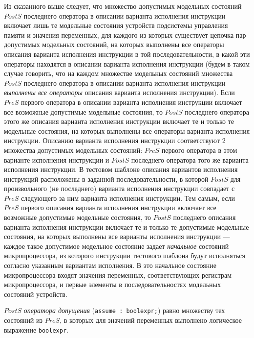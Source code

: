 Из сказанного выше следует, что множество допустимых модельных состояний $PostS$ последнего оператора в описании варианта исполнения инструкции включает лишь те модельные состояния устройств подсистемы управления памяти и значения переменных, для каждого из которых существует цепочка пар допустимых модельных состояний, на которых выполнены все операторы описания варианта исполнения инструкции в той последовательности, в какой эти операторы находятся в описании варианта исполнения инструкции (будем в таком случае говорить, что на каждом множестве модельных состояний множества $PostS$ последнего оператора в описании варианта исполнения инструкции \emph{выполнены все операторы} описания варианта исполнения инструкции). Если $PreS$ первого оператора в описании варианта исполнения инструкции включает все возможные допустимые модельные состояния, то $PostS$ последнего оператора этого же описания варианта исполнения инструкции включает те и только те модельные состояния, на которых выполнены все операторы варианта исполнения инструкции. Описанию варианта исполнения инструкции соответствуют 2 множества допустимых модельных состояний: $PreS$ первого оператора в этом варианте исполнения инструкции и $PostS$ последнего оператора того же варианта исполнения инструкции. В тестовом шаблоне описания вариантов исполнения инструкций расположены в заданной последовательности, в которой $PostS$ для произвольного (не последнего) варианта исполнения инструкции совпадает с $PreS$ следующего за ним варианта исполнения инструкции. Тем самым, если $PreS$ первого описания варианта исполнения инструкции включает все возможные допустимые модельные состояния, то $PostS$ последнего описания варианта исполнения инструкции включает те и только те допустимые модельные состояния, на которых выполнены все варианты исполнения инструкции --- каждое такое допустимое модельное состояние задает \emph{начальное} состояний микропроцессора, из которого инструкции тестового шаблона будут исполняться согласно указанным вариантам исполнения. В это начальное состояние микропроцессора входят значения переменных, соответствующих регистрам микропроцессора, и первые элементы в последовательностях модельных состояний устройств.

$PostS$ \emph{оператора допущения} (\texttt{assume : boolexpr;}) равно множеству тех состояний из $PreS$, в которых для значений переменных выполнено логическое выражение \texttt{boolexpr}.

